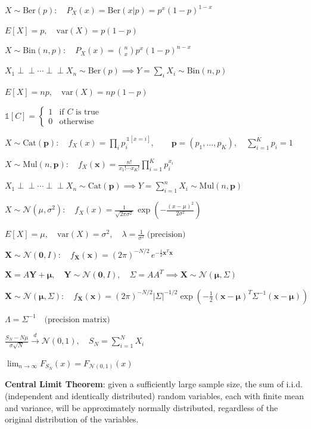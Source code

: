 \vspace{1em}

$X \sim \text{Ber}(p): \quad P_X(x) = \text{Ber}(x|p) = p^x(1-p)^{1-x}$

$E[X] = p, \quad \text{var}(X) = p(1-p)$

$X \sim \text{Bin}(n,p): \quad P_X(x) = \binom{n}{x}p^x(1-p)^{n-x}$

$X_1 \perp\!\!\!\perp \cdots \perp\!\!\!\perp X_n \sim \text{Ber}(p) \implies Y = \sum_i X_i \sim \text{Bin}(n,p)$

$E[X] = np, \quad \text{var}(X) = np(1-p)$

$\mathbb{1}[C] = \begin{cases}1 & \text{if } C \text{ is true} \\ 0 & \text{otherwise}\end{cases}$

$X \sim \text{Cat}(\mathbf{p}): \quad f_X(x) = \prod_i p_i^{\,\mathbb{1}[x=i]}, \qquad \mathbf{p} = (p_1,\ldots,p_K),\quad \sum_{i=1}^K p_i = 1$

$X \sim \text{Mul}(n,\mathbf{p}): \quad f_X(\mathbf{x}) = \frac{n!}{x_1!\cdots x_K!}\prod_{i=1}^{K} p_i^{x_i}$

$X_1 \perp\!\!\!\perp \cdots \perp\!\!\!\perp X_n \sim \text{Cat}(\mathbf{p}) \implies Y = \sum_{i=1}^n X_i \sim \text{Mul}(n,\mathbf{p})$

$X \sim \mathcal{N}(\mu, \sigma^2): \quad f_X(x) = \frac{1}{\sqrt{2\pi\sigma^2}}\,\exp\!\left(-\frac{(x-\mu)^2}{2\sigma^2}\right)$

$E[X] = \mu, \quad \text{var}(X) = \sigma^2, \quad \lambda = \frac{1}{\sigma^2} \; \text{(precision)}$

$\mathbf{X} \sim \mathcal{N}(\mathbf{0}, I): \quad f_{\mathbf{X}}(\mathbf{x}) = (2\pi)^{-N/2}\,e^{-\frac{1}{2}\mathbf{x}^T\mathbf{x}}$

$\mathbf{X} = A\mathbf{Y} + \boldsymbol{\mu}, \quad \mathbf{Y} \sim \mathcal{N}(\mathbf{0}, I), \quad \Sigma = AA^T \implies \mathbf{X} \sim \mathcal{N}(\boldsymbol{\mu}, \Sigma)$

$\mathbf{X} \sim \mathcal{N}(\boldsymbol{\mu}, \Sigma): \quad f_{\mathbf{X}}(\mathbf{x}) = (2\pi)^{-N/2}|\Sigma|^{-1/2}\exp\!\left(-\frac{1}{2}(\mathbf{x}-\boldsymbol{\mu})^T\Sigma^{-1}(\mathbf{x}-\boldsymbol{\mu})\right)$

$\Lambda = \Sigma^{-1} \quad \text{(precision matrix)}$

$\frac{S_N - N\mu}{\sigma\sqrt{N}} \xrightarrow{d} \mathcal{N}(0,1), \quad S_N = \sum_{i=1}^N X_i$

$\lim_{n \to \infty} F_{S_N}(x) = F_{\mathcal{N}(0,1)}(x)$

\textbf{Central Limit Theorem}: given a sufficiently large sample size, the sum of i.i.d. (independent and identically distributed) random variables, each with finite mean and variance, will be approximately normally distributed, regardless of the original distribution of the variables.
